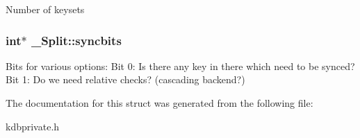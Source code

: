 \label{struct__Split_a9c80f6a2c7069e4aca5a47df97e59547}
Number of keysets \hypertarget{struct__Split_a228c2be31180b880019d6b131919d2e7}{
\subsubsection[{syncbits}]{\setlength{\rightskip}{0pt plus 5cm}int$\ast$ {\bf \_\-Split::syncbits}}}
\label{struct__Split_a228c2be31180b880019d6b131919d2e7}
Bits for various options: Bit 0: Is there any key in there which need to be synced? Bit 1: Do we need relative checks? (cascading backend?) 

The documentation for this struct was generated from the following file:\begin{DoxyCompactItemize}
\item 
kdbprivate.h\end{DoxyCompactItemize}
